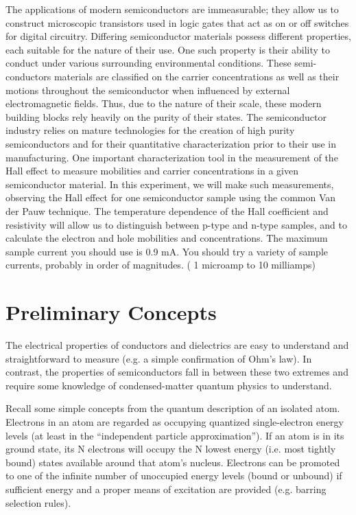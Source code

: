 \documentclass{../lab}
\begin{document}
The applications of modern semiconductors are immeasurable; they allow us to construct microscopic transistors used in logic gates that act as on or off switches for digital circuitry. Differing semiconductor materials possess different properties, each suitable for the nature of their use. One such property is their ability to conduct under various surrounding environmental conditions. These semi-conductors materials are classified on the carrier concentrations as well as their motions throughout the semiconductor when influenced by external electromagnetic fields. Thus, due to the nature of their scale, these modern building blocks rely heavily on the purity of their states. The semiconductor industry relies on mature technologies for the creation of high purity semiconductors and for their quantitative characterization prior to their use in manufacturing. One important characterization tool in the measurement of the Hall effect to measure mobilities and carrier concentrations in a given semiconductor material. In this experiment, we will make such measurements, observing the Hall effect for one semiconductor sample using the common Van der Pauw technique. The temperature dependence of the Hall coefficient and resistivity will allow us to distinguish between p-type and n-type samples, and to calculate the electron and hole mobilities and concentrations. The maximum sample current you should use is 0.9 mA. You should try a variety of sample currents, probably in order of magnitudes. ( 1 microamp to 10 milliamps)

\section{Preliminary Concepts}

The electrical properties of conductors and dielectrics are easy to understand and straightforward to measure (e.g. a simple confirmation of Ohm's law). In contrast, the properties of semiconductors fall in between these two extremes and require some knowledge of condensed-matter quantum physics to understand.

Recall some simple concepts from the quantum description of an isolated atom. Electrons in an atom are regarded as occupying quantized single-electron energy levels (at least in the ``independent particle approximation''). If an atom is in its ground state, its N electrons will occupy the N lowest energy (i.e. most tightly bound) states available around that atom's nucleus. Electrons can be promoted to one of the infinite number of unoccupied energy levels (bound or unbound) if sufficient energy and a proper means of excitation are provided (e.g. barring selection rules).
\end{document}
